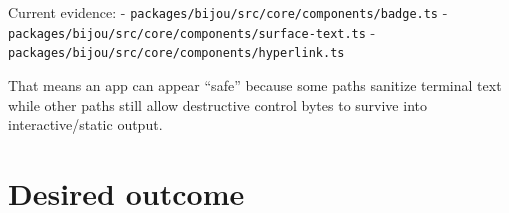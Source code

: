 Current evidence: - \texttt{p\allowbreak{}a\allowbreak{}c\allowbreak{}k\allowbreak{}a\allowbreak{}g\allowbreak{}e\allowbreak{}s\allowbreak{}/\allowbreak{}b\allowbreak{}i\allowbreak{}j\allowbreak{}o\allowbreak{}u\allowbreak{}/\allowbreak{}s\allowbreak{}r\allowbreak{}c\allowbreak{}/\allowbreak{}c\allowbreak{}o\allowbreak{}r\allowbreak{}e\allowbreak{}/\allowbreak{}c\allowbreak{}o\allowbreak{}m\allowbreak{}p\allowbreak{}o\allowbreak{}n\allowbreak{}e\allowbreak{}n\allowbreak{}t\allowbreak{}s\allowbreak{}/\allowbreak{}b\allowbreak{}a\allowbreak{}d\allowbreak{}g\allowbreak{}e\allowbreak{}.\allowbreak{}t\allowbreak{}s} - \texttt{p\allowbreak{}a\allowbreak{}c\allowbreak{}k\allowbreak{}a\allowbreak{}g\allowbreak{}e\allowbreak{}s\allowbreak{}/\allowbreak{}b\allowbreak{}i\allowbreak{}j\allowbreak{}o\allowbreak{}u\allowbreak{}/\allowbreak{}s\allowbreak{}r\allowbreak{}c\allowbreak{}/\allowbreak{}c\allowbreak{}o\allowbreak{}r\allowbreak{}e\allowbreak{}/\allowbreak{}c\allowbreak{}o\allowbreak{}m\allowbreak{}p\allowbreak{}o\allowbreak{}n\allowbreak{}e\allowbreak{}n\allowbreak{}t\allowbreak{}s\allowbreak{}/\allowbreak{}s\allowbreak{}u\allowbreak{}r\allowbreak{}f\allowbreak{}a\allowbreak{}c\allowbreak{}e\allowbreak{}-\allowbreak{}t\allowbreak{}e\allowbreak{}x\allowbreak{}t\allowbreak{}.\allowbreak{}t\allowbreak{}s} - \texttt{p\allowbreak{}a\allowbreak{}c\allowbreak{}k\allowbreak{}a\allowbreak{}g\allowbreak{}e\allowbreak{}s\allowbreak{}/\allowbreak{}b\allowbreak{}i\allowbreak{}j\allowbreak{}o\allowbreak{}u\allowbreak{}/\allowbreak{}s\allowbreak{}r\allowbreak{}c\allowbreak{}/\allowbreak{}c\allowbreak{}o\allowbreak{}r\allowbreak{}e\allowbreak{}/\allowbreak{}c\allowbreak{}o\allowbreak{}m\allowbreak{}p\allowbreak{}o\allowbreak{}n\allowbreak{}e\allowbreak{}n\allowbreak{}t\allowbreak{}s\allowbreak{}/\allowbreak{}h\allowbreak{}y\allowbreak{}p\allowbreak{}e\allowbreak{}r\allowbreak{}l\allowbreak{}i\allowbreak{}n\allowbreak{}k\allowbreak{}.\allowbreak{}t\allowbreak{}s}

That means an app can appear ``safe'' because some paths sanitize terminal text while other paths still allow destructive control bytes to survive into interactive/static output.

\section{Desired outcome}\label{record-258-desired-outcome}

